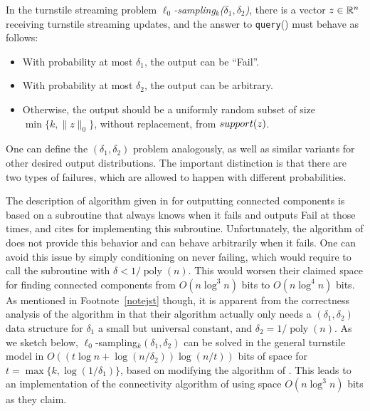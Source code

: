\begin{definition}
In the turnstile streaming problem {\em $\ell_0$-sampling$_k$($\delta_1,\delta_2$)}, there is a vector $z\in\mathbb{R}^n$ receiving turnstile streaming updates, and the answer to \texttt{query}() must behave as follows:
\begin{itemize}
\item With probability at most $\delta_1$, the output can be ``\textsf{Fail}''.
\item With probability at most $\delta_2$, the output can be arbitrary.
\item Otherwise, the output should be a uniformly random subset of size $\min\{k,\|z\|_0\}$, without replacement, from $\mathop{support}(z)$.
\end{itemize}
\end{definition}

One can define the $(\delta_1,\delta_2)$ problem analogously, as well as similar variants for other desired output distributions. The important distinction is that there are two types of failures, which are allowed to happen with different probabilities.

The description of algorithm given in \cite{AhnGM12a} for outputting connected components is based on a \suppfind{} subroutine that always knows when it fails and outputs \textsf{Fail} at those times, and \cite{AhnGM12a} cites \cite{JowhariST11} for implementing this subroutine. Unfortunately, the algorithm of \cite{JowhariST11} does not provide this behavior and can behave arbitrarily when it fails. One can avoid this issue by simply conditioning on never failing, which would require \cite{AhnGM12a} to call the \cite{JowhariST11} subroutine with $\delta < 1/\mathop{poly}(n)$. This would worsen their claimed space for finding connected components from $O(n\log^3 n)$ bits to $O(n\log^4 n)$ bits. As mentioned in Footnote~\ref{notejst} though, it is apparent from the correctness analysis of the algorithm in \cite{AhnGM12a} that their algorithm actually only needs a $(\delta_1,\delta_2)$ data structure for $\delta_1$ a small but universal constant, and $\delta_2 = 1/\mathop{poly}(n)$. As we sketch below, $\ell_0$-sampling$_k(\delta_1,\delta_2)$ can be solved in the general turnstile model in $O((t\log n + \log(n/\delta_2)) \log (n/t))$ bits of space for $t = \max\{k, \log(1/\delta_1)\}$, based on modifying the algorithm of \cite{JowhariST11}. This leads to an implementation of the connectivity algorithm of \cite{AhnGM12a} using space $O(n\log^3 n)$ bits as they claim.

